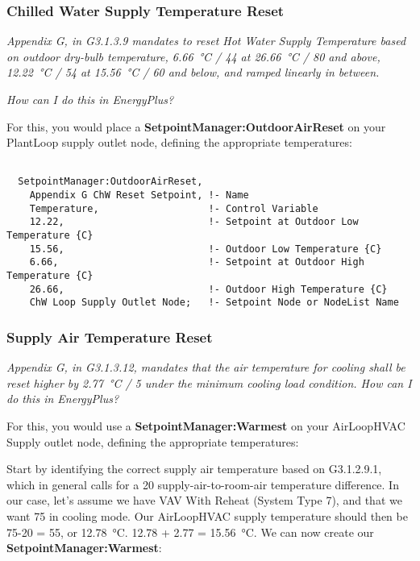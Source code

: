 \subsubsection{Chilled Water Supply Temperature Reset}%
\label{ssub:chilled_water_supply_temperature_reset}

\emph{Appendix G, in G3.1.3.9 mandates to reset Hot Water Supply Temperature based on outdoor dry-bulb temperature, \SI{6.66}{\celsius} / \SI{44}{\farenheit} at \SI{26.66}{\celsius}  / \SI{80}{\farenheit}  and above, \SI{12.22}{\celsius} / \SI{54}{\farenheit} at \SI{15.56}{\celsius} / \SI{60}{\farenheit} and below, and ramped linearly in between.}

\emph{How can I do this in EnergyPlus?}

For this, you would place a \textbf{SetpointManager:OutdoorAirReset} on your PlantLoop supply outlet node, defining the appropriate temperatures:

\begin{lstlisting}

  SetpointManager:OutdoorAirReset,
    Appendix G ChW Reset Setpoint, !- Name
    Temperature,                   !- Control Variable
    12.22,                         !- Setpoint at Outdoor Low Temperature {C}
    15.56,                         !- Outdoor Low Temperature {C}
    6.66,                          !- Setpoint at Outdoor High Temperature {C}
    26.66,                         !- Outdoor High Temperature {C}
    ChW Loop Supply Outlet Node;   !- Setpoint Node or NodeList Name

\end{lstlisting}




\subsubsection{Supply Air Temperature Reset}%
\label{ssub:supply_air_temperature_reset}

\emph{Appendix G, in G3.1.3.12, mandates that the air temperature for cooling shall be reset higher by \SI{2.77}{\celsius} / \SI{5}{\farenheit} under the minimum cooling load condition. How can I do this in EnergyPlus?}

For this, you would use a \textbf{SetpointManager:Warmest} on your AirLoopHVAC Supply outlet node, defining the appropriate temperatures:

Start by identifying the correct supply air temperature based on G3.1.2.9.1, which in general calls for a \SI{20}{\farenheit} supply-air-to-room-air temperature difference.
In our case, let's assume we have VAV With Reheat (System Type 7), and that we want \SI{75}{\farenheit} in cooling mode. Our AirLoopHVAC supply temperature should then be 75-20 = \SI{55}{\farenheit}, or \SI{12.78}{\celsius}. 12.78  + 2.77 = \SI{15.56}{\celsius}. We can now create our \textbf{SetpointManager:Warmest}:

